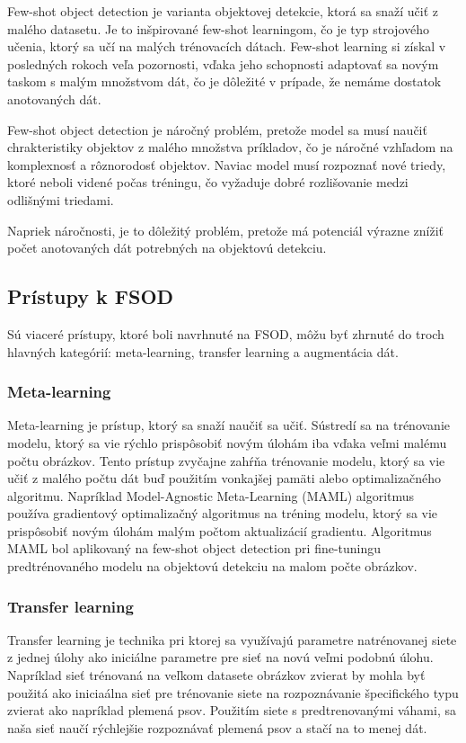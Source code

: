 Few-shot object detection je varianta objektovej detekcie, ktorá sa snaží učiť z malého datasetu. Je to inšpirované few-shot learningom, čo je typ strojového učenia, ktorý sa učí na malých trénovacích dátach. Few-shot learning si získal v posledných rokoch veľa pozornosti, vďaka jeho schopnosti adaptovať sa novým taskom s malým množstvom dát, čo je dôležité v prípade, že nemáme dostatok anotovaných dát. 

Few-shot object detection je náročný problém, pretože model sa musí naučiť chrakteristiky objektov z malého množstva príkladov, čo je náročné vzhľadom na komplexnosť a rôznorodosť objektov. Naviac model musí rozpoznať nové triedy, ktoré neboli videné počas tréningu, čo vyžaduje dobré rozlišovanie medzi odlišnými triedami. 

Napriek náročnosti, je to dôležitý problém, pretože má potenciál výrazne znížiť počet anotovaných dát potrebných na objektovú detekciu. 

\subsection{Prístupy k FSOD}
\hspace{\parindent}Sú viaceré prístupy, ktoré boli navrhnuté na FSOD, môžu byť zhrnuté do troch hlavných kategórií: meta-learning, transfer learning a augmentácia dát.

\subsubsection{Meta-learning}
\hspace{\parindent}Meta-learning je prístup, ktorý sa snaží naučiť sa učiť. Sústredí sa na trénovanie modelu, ktorý sa vie rýchlo prispôsobiť novým úlohám iba vďaka veľmi malému počtu obrázkov. Tento prístup zvyčajne zahŕňa trénovanie modelu, ktorý sa vie učiť z malého počtu dát buď použitím vonkajšej pamäti alebo optimalizačného algoritmu. Napríklad Model-Agnostic Meta-Learning (MAML) \cite{finn2017model} algoritmus používa gradientový optimalizačný algoritmus na tréning modelu, ktorý sa vie prispôsobiť novým úlohám malým počtom aktualizácií gradientu. Algoritmus MAML bol aplikovaný na few-shot object detection pri fine-tuningu predtrénovaného modelu na objektovú detekciu na malom počte obrázkov.

\subsubsection{Transfer learning}
\hspace{\parindent}Transfer learning je technika pri ktorej sa využívajú parametre natrénovanej siete z jednej úlohy ako iniciálne parametre pre sieť na novú veľmi podobnú úlohu. Napríklad sieť trénovaná na veľkom datasete obrázkov zvierat by mohla byť použitá ako iniciaálna sieť pre trénovanie siete na rozpoznávanie špecifického typu zvierat ako napríklad plemená psov. Použitím siete s predtrenovanými váhami, sa naša sieť naučí rýchlejšie rozpoznávať plemená psov a stačí na to menej dát.


